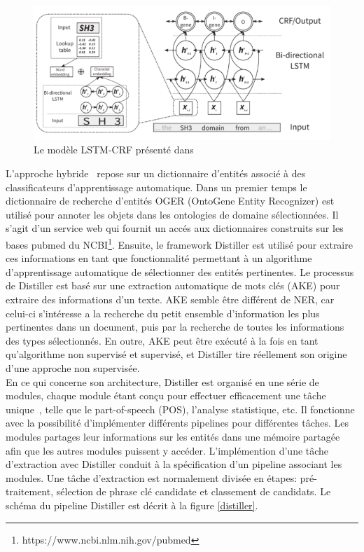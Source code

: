 \begin{figure}[!ht]
\begin{center}
	\includegraphics[width=1\textwidth]{Figures/LSTMCRF.PNG}
\end{center}
\caption{\label{LSTMCRF} Le modèle LSTM-CRF présenté dans \cite{Habibi2017a}}
\end{figure}

L'approche hybride~\cite{Basaldella2017} repose sur un dictionnaire d'entités associé à des classificateurs d'apprentissage automatique. Dans un premier temps le dictionnaire de recherche d’entités OGER (OntoGene Entity Recognizer) est utilisé pour annoter les objets dans les ontologies de domaine sélectionnées. Il s'agit d'un service web qui fournit un accés aux dictionnaires construits sur les bases pubmed du NCBI\footnote{https://www.ncbi.nlm.nih.gov/pubmed}. Ensuite, le framework Distiller est utilisé pour extraire ces informations en tant que fonctionnalité permettant à un algorithme d’apprentissage automatique de sélectionner des entités pertinentes. Le processus de Distiller est basé sur une extraction automatique de mots clés (AKE) pour extraire des informations d’un texte. AKE semble être différent de NER, car celui-ci s'intéresse a la recherche du petit ensemble d'information les plus pertinentes dans un document, puis par la recherche de toutes les informations des types sélectionnés. En outre, AKE peut être exécuté à la fois en tant qu’algorithme non supervisé et supervisé, et Distiller tire réellement son origine d’une approche non supervisée. \\
En ce qui concerne son architecture, Distiller est organisé en une série de modules, chaque module étant conçu pour effectuer efficacement une tâche unique~\cite{basaldella2015introducing}, telle que le part-of-speech (POS), l'analyse statistique, etc. Il fonctionne avec la possibilité d'implémenter différents pipelines pour différentes tâches. Les modules partages leur informations sur les entités dans une mémoire partagée afin que les autres modules puissent y accéder. L'implémention d'une tâche d'extraction avec Distiller conduit à la spécification d'un pipeline associant les modules. Une tâche d'extraction est normalement divisée en étapes: pré-traitement, sélection de phrase clé candidate et classement de candidats. Le schéma du pipeline Distiller est décrit à la figure \ref{distiller}.

